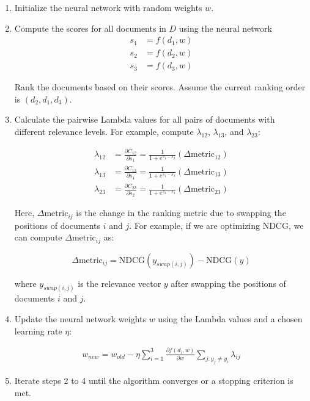 \documentclass[12pt]{article}
\begin{document}
\begin{enumerate}
\item Initialize the neural network with random weights $w$.
\item Compute the scores for all documents in $D$ using the neural network
\begin{align*}
    s_1 &= f(d_1, w) \\
    s_2 &= f(d_2, w) \\
    s_3 &= f(d_3, w)
\end{align*}

Rank the documents based on their scores. Assume the current ranking order is $(d_2, d_1, d_3)$.

\item Calculate the pairwise Lambda values for all pairs of documents with different relevance levels. For example, compute $\lambda_{12}$, $\lambda_{13}$, and $\lambda_{23}$:

\begin{align*}
    \lambda_{12} &= \frac{\partial C_{12}}{\partial s_1} = \frac{1}{1 + e^{s_1 - s_2}} (\Delta \text{metric}_{12}) \\
    \lambda_{13} &= \frac{\partial C_{13}}{\partial s_1} = \frac{1}{1 + e^{s_1 - s_3}} (\Delta \text{metric}_{13}) \\
    \lambda_{23} &= \frac{\partial C_{23}}{\partial s_2} = \frac{1}{1 + e^{s_2 - s_3}} (\Delta \text{metric}_{23})
\end{align*}

Here, $\Delta \text{metric}_{ij}$ is the change in the ranking metric due to swapping the positions of documents $i$ and $j$. For example, if we are optimizing NDCG, we can compute $\Delta \text{metric}_{ij}$ as:

\begin{equation*}
    \Delta \text{metric}_{ij} = \text{NDCG}(y_{swap(i, j)}) - \text{NDCG}(y)
\end{equation*}

where $y_{swap(i, j)}$ is the relevance vector $y$ after swapping the positions of documents $i$ and $j$.

\item Update the neural network weights $w$ using the Lambda values and a chosen learning rate $\eta$:

\begin{align*}
    w_{new} = w_{old} - \eta \sum_{i=1}^{3} \frac{\partial f(d_i, w)}{\partial w} \sum_{j: y_j \neq y_i} \lambda_{ij}
\end{align*}

\item Iterate steps 2 to 4 until the algorithm converges or a stopping criterion is met.
\end{enumerate}
\end{document}

